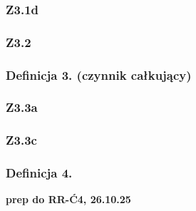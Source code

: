\documentclass[10pt,a4paper]{article}
\newcommand{\zagadnienie}[3]{%
    \clearpage %
    \noindent\textbf{#1} #2\\
    #3
}
\begin{document}
{    \subsubsection*{Z3.1d}
    \begin{quote}
    \end{quote}

    \subsubsection*{Z3.2}
    \begin{quote}
    \end{quote}

    \begin{tcolorbox}[mybox]
    \subsubsection*{Definicja 3. (czynnik całkujący)}
    \begin{quote}
    \end{quote}
    \end{tcolorbox}

    \subsubsection*{Z3.3a}
    \begin{quote}
    \end{quote}

    \subsubsection*{Z3.3c}
    \begin{quote}
    \end{quote}

    \begin{tcolorbox}[mybox]
    \subsubsection*{Definicja 4.}
    \begin{quote}
    \end{quote}
    \end{tcolorbox}
}
\zagadnienie{prep do RR-Ć4, 26.10.25}{}
\end{document}
